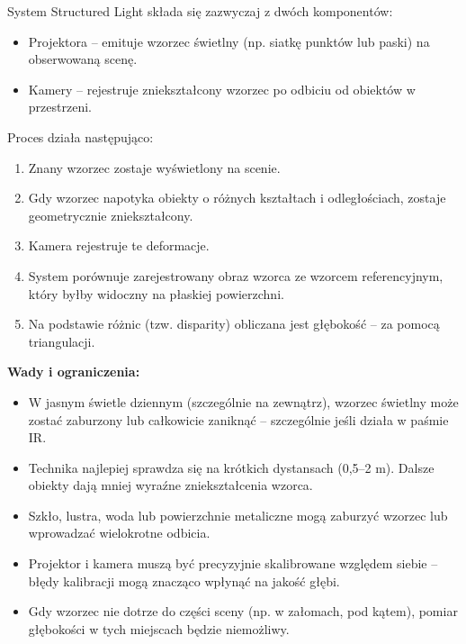 \documentclass[magisterska]{pracadypl}
\begin{document}
System Structured Light składa się zazwyczaj z dwóch komponentów:

\begin{itemize}
  \item Projektora – emituje wzorzec świetlny (np. siatkę punktów lub paski) na obserwowaną scenę.

  \item Kamery – rejestruje zniekształcony wzorzec po odbiciu od obiektów w przestrzeni.
\end{itemize}

Proces działa następująco:

\begin{enumerate}
  \item Znany wzorzec zostaje wyświetlony na scenie.

  \item Gdy wzorzec napotyka obiekty o różnych kształtach i odległościach, zostaje geometrycznie zniekształcony.

  \item Kamera rejestruje te deformacje.

  \item System porównuje zarejestrowany obraz wzorca ze wzorcem referencyjnym, który byłby widoczny na płaskiej powierzchni.

  \item Na podstawie różnic (tzw. disparity) obliczana jest głębokość – za pomocą triangulacji.
\end{enumerate}

\begin{minipage}[t]{\textwidth}
\textbf{Wady i ograniczenia:}
\begin{itemize}
  \item W jasnym świetle dziennym (szczególnie na zewnątrz), wzorzec świetlny może zostać zaburzony lub całkowicie zaniknąć – szczególnie jeśli działa w paśmie IR.

  \item Technika najlepiej sprawdza się na krótkich dystansach (0,5–2 m). Dalsze obiekty dają mniej wyraźne zniekształcenia wzorca.

  \item Szkło, lustra, woda lub powierzchnie metaliczne mogą zaburzyć wzorzec lub wprowadzać wielokrotne odbicia.

  \item Projektor i kamera muszą być precyzyjnie skalibrowane względem siebie – błędy kalibracji mogą znacząco wpłynąć na jakość głębi.

  \item Gdy wzorzec nie dotrze do części sceny (np. w załomach, pod kątem), pomiar głębokości w tych miejscach będzie niemożliwy.
\end{itemize}
\end{minipage}
\end{document}
